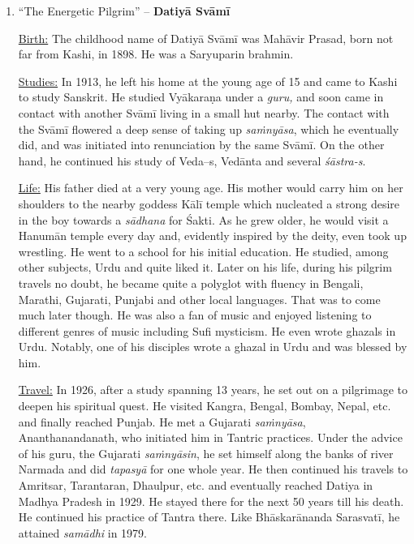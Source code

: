 \begin{enumerate}
 \item  “The Energetic Pilgrim” – \textbf{Datiyā Svāmī}

 \underline{Birth:} The childhood name of Datiyā Svāmī was Mahāvir Prasad, born not far from Kashi, in 1898. He was a Saryuparin brahmin.

 \underline{Studies:} In 1913, he left his home at the young age of 15 and came to Kashi to study Sanskrit. He studied Vyākaraṇa under a \textit{guru,} and soon came in contact with another Svāmī living in a small hut nearby. The contact with the Svāmī flowered a deep sense of taking up \textit{saṁnyāsa}, which he eventually did, and was initiated into renunciation by the same Svāmī. On the other hand, he continued his study of {Veda--s, Vedānta} and several \textit{śāstra-s}.

\newpage

 \underline{Life:} His father died at a very young age. His mother would carry him on her shoulders to the nearby goddess Kālī temple which nucleated a strong desire in the boy towards a \textit{sādhana} for Śakti. As he grew older, he would visit a Hanumān temple every day and, evidently inspired by the deity, even took up wrestling. He went to a school for his initial education. He studied, among other subjects, Urdu and quite liked it. Later on his life, during his pilgrim travels no doubt, he became quite a polyglot with fluency in Bengali, Marathi, Gujarati, Punjabi and other local languages. That was to come much later though. He was also a fan of music and enjoyed listening to different genres of music including Sufi mysticism. He even wrote ghazals in Urdu. Notably, one of his disciples wrote a ghazal in Urdu and was blessed by him.

 \underline{Travel:} In 1926, after a study spanning 13 years, he set out on a pilgrimage to deepen his spiritual quest. He visited Kangra, Bengal, Bombay, Nepal, etc. and finally reached Punjab. He met a Gujarati \textit{saṁnyāsa}, Ananthanandanath, who initiated him in Tantric practices. Under the advice of his guru, the Gujarati \textit{saṁnyāsin}, he set himself along the banks of river Narmada and did \textit{tapasyā} for one whole year. He then continued his travels to Amritsar, Tarantaran, Dhaulpur, etc. and eventually reached Datiya in Madhya Pradesh in 1929. He stayed there for the next 50 years till his death. He continued his practice of Tantra there. Like Bhāskarānanda Sarasvatī, he attained \textit{samādhi} in 1979.


\end{enumerate}
